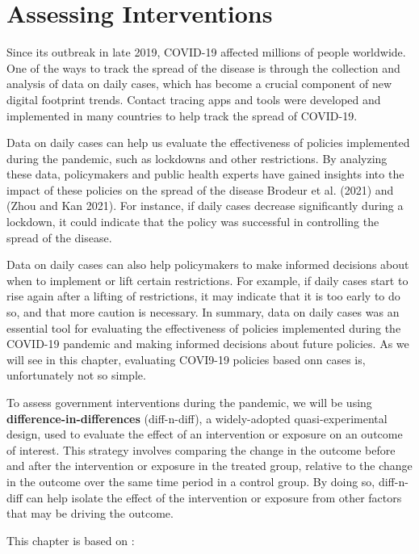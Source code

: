 \documentclass[
  letterpaper,
  DIV=11,
  numbers=noendperiod]{scrreprt}
\begin{document}

\hypertarget{sec-chp9}{%
\chapter{Assessing Interventions}\label{sec-chp9}}

Since its outbreak in late 2019, COVID-19 affected millions of people
worldwide. One of the ways to track the spread of the disease is through
the collection and analysis of data on daily cases, which has become a
crucial component of new digital footprint trends. Contact tracing apps
and tools were developed and implemented in many countries to help track
the spread of COVID-19.

Data on daily cases can help us evaluate the effectiveness of policies
implemented during the pandemic, such as lockdowns and other
restrictions. By analyzing these data, policymakers and public health
experts have gained insights into the impact of these policies on the
spread of the disease Brodeur et al. (2021) and (Zhou and Kan 2021). For
instance, if daily cases decrease significantly during a lockdown, it
could indicate that the policy was successful in controlling the spread
of the disease.

Data on daily cases can also help policymakers to make informed
decisions about when to implement or lift certain restrictions. For
example, if daily cases start to rise again after a lifting of
restrictions, it may indicate that it is too early to do so, and that
more caution is necessary. In summary, data on daily cases was an
essential tool for evaluating the effectiveness of policies implemented
during the COVID-19 pandemic and making informed decisions about future
policies. As we will see in this chapter, evaluating COVI9-19 policies
based onn cases is, unfortunately not so simple.

To assess government interventions during the pandemic, we will be using
\textbf{difference-in-differences} (diff-n-diff), a widely-adopted
quasi-experimental design, used to evaluate the effect of an
intervention or exposure on an outcome of interest. This strategy
involves comparing the change in the outcome before and after the
intervention or exposure in the treated group, relative to the change in
the outcome over the same time period in a control group. By doing so,
diff-n-diff can help isolate the effect of the intervention or exposure
from other factors that may be driving the outcome.

This chapter is based on :
\end{document}
